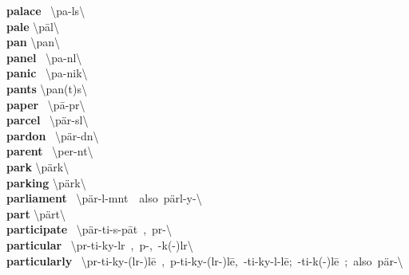 \documentclass[10pt,a4paper]{article}
\begin{document}
\begin{multicols}{2}
\textbf{ palace }\quad \ \textbackslash \textprimstress pa-l\textschwa s\textbackslash \\
\textbf{ pale }\quad \textbackslash \textprimstress p\={a}l\textbackslash \\
\textbf{ pan }\quad \textbackslash \textprimstress pan\textbackslash \\
\textbf{ panel }\quad \ \textbackslash \textprimstress pa-n\textsuperscript{\textreve}l\textbackslash \\
\textbf{ panic }\quad \ \textbackslash \textprimstress pa-nik\textbackslash \\
\textbf{ pants }\quad \textbackslash \textprimstress pan(t)s\textbackslash \\
\textbf{ paper }\quad \ \textbackslash \textprimstress p\={a}-p\textschwa r\textbackslash \\
\textbf{ parcel }\quad \ \textbackslash \textprimstress p\"{a}r-s\textschwa l\textbackslash \\
\textbf{ pardon }\quad \ \textbackslash \textprimstress p\"{a}r-d\textsuperscript{\textreve}n\textbackslash \\
\textbf{ parent }\quad \ \textbackslash \textprimstress per-\textschwa nt\textbackslash \\
\textbf{ park }\quad \textbackslash \textprimstress p\"{a}rk\textbackslash \\
\textbf{ parking }\quad \textbackslash \textprimstress p\"{a}rk\textbackslash \\
\textbf{ parliament }\quad \ \textbackslash \textprimstress p\"{a}r-l\textschwa -m\textschwa nt\ \ also\ \textprimstress p\"{a}rl-y\textschwa -\textbackslash \\
\textbf{ part }\quad \textbackslash \textprimstress p\"{a}rt\textbackslash \\
\textbf{ participate }\quad \ \textbackslash p\"{a}r-\textprimstress ti-s\textschwa -\textsecstress p\={a}t\ ,\ p\textschwa r-\textbackslash \\
\textbf{ particular }\quad \ \textbackslash p\textschwa r-\textprimstress ti-ky\textschwa -l\textschwa r\ ,\ p\textschwa -,\ -k(\textschwa -)l\textschwa r\textbackslash \\
\textbf{ particularly }\quad \ \textbackslash p\textschwa r-\textprimstress ti-ky\textschwa -(l\textschwa r-)l\={e}\ ,\ p\textschwa -\textprimstress ti-ky\textschwa -(l\textschwa r-)l\={e},\ -\textprimstress ti-ky\textschwa -l\textschwa -l\={e};\ -\textprimstress ti-k(\textschwa -)l\={e}\ ;\ also\ p\"{a}r-\textbackslash \\

\end{multicols}
\end{document}
